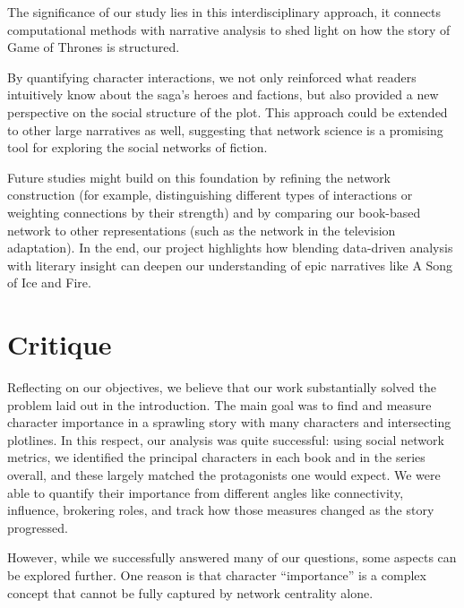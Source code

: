 \documentclass[12pt, a4paper]{article}
\begin{document}
The significance of our study lies in this interdisciplinary approach, 
it connects computational methods with narrative analysis to shed light on how the story of Game of Thrones is structured. 

By quantifying character interactions, we not only reinforced what readers intuitively know about the saga’s heroes and factions, 
but also provided a new perspective on the social structure of the plot. 
This approach could be extended to other large narratives as well, suggesting that network science is a promising tool for exploring the social networks of fiction.
 

Future studies might build on this foundation by refining the network construction 
 (for example, distinguishing different types of interactions or weighting connections by their strength) 
 and by comparing our book-based network to other representations (such as the network in the television adaptation). 
 In the end, our project highlights how blending data-driven analysis with literary insight can deepen our understanding 
 of epic narratives like A Song of Ice and Fire.

\section{Critique}
Reflecting on our objectives, we believe that our work substantially solved the problem laid out in the introduction. 
The main goal was to find and measure character importance in a sprawling story with many characters and intersecting plotlines. 
In this respect, our analysis was quite successful: using social network metrics, 
we identified the principal characters in each book and in the series overall, 
and these largely matched the protagonists one would expect. We were able to quantify their importance from different angles
like connectivity, influence, brokering roles, and track how those measures changed as the story progressed. 



However, while we successfully answered many of our questions, some aspects can be explored further.
One reason is that character “importance” is a complex concept that cannot be fully captured by network centrality alone. 
\end{document}
